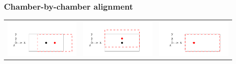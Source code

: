 \documentclass[compress]{beamer}
\begin{document}
\begin{frame}
\frametitle{Chamber-by-chamber alignment}
\vspace{-1 cm}
\begin{center}
\begin{tabular}{p{0.31\linewidth} p{0.31\linewidth} p{0.31\linewidth}}
  \begin{minipage}{\linewidth}
    \includegraphics[width=\linewidth]{dof_x.pdf}
  \end{minipage} &
  \begin{minipage}{\linewidth}
    \includegraphics[width=\linewidth]{dof_y.pdf}
  \end{minipage} &
  \begin{minipage}{\linewidth}
    \includegraphics[width=\linewidth]{dof_z.pdf}

\end{minipage}
\end{tabular}
\end{center}
\end{frame}
\end{document}
